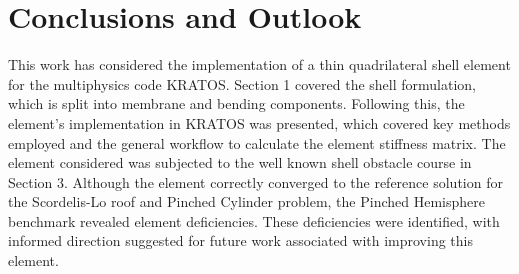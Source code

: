 
\chapter{Conclusions and Outlook}
\label{chap:conclusions}

This work has considered the implementation of a thin quadrilateral shell element for the multiphysics code KRATOS. Section 1 covered the shell formulation, which is split into membrane and bending components. Following this, the element's implementation in KRATOS was presented, which covered key methods employed and the general workflow to calculate the element stiffness matrix. The element considered was subjected to the well known shell obstacle course in Section 3. Although the element correctly converged to the reference solution for the Scordelis-Lo roof and Pinched Cylinder problem, the Pinched Hemisphere benchmark revealed element deficiencies. These deficiencies were identified, with informed direction suggested  for future work associated with improving this element. 
